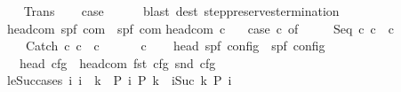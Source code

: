 \begin{isabellebody}
\isamarkupfalse%
\isanewline
\ \ \isamarkupfalse%
\ Trans\isanewline
\ \ \isamarkupfalse%
\ {\isacharquery}case\isanewline
\ \ \ \ \isamarkupfalse%
\ {\isacharparenleft}blast\ dest{\isacharcolon}\ step{\isacharunderscore}preserves{\isacharunderscore}termination{\isacharparenright}\isanewline
{}\isamarkupfalse%
%
\endisatagproof
{\isafoldproof}%
%
\isadelimproof
\isanewline
%
\endisadelimproof
\isanewline
\isanewline
\isanewline
{}\isamarkupfalse%
\ head{\isacharunderscore}com{\isacharcolon}{\isacharcolon}\ {\isachardoublequoteopen}{\isacharparenleft}{\isacharprime}s{\isacharcomma}{\isacharprime}p{\isacharcomma}{\isacharprime}f{\isacharparenright}\ com\ {\isasymRightarrow}\ {\isacharparenleft}{\isacharprime}s{\isacharcomma}{\isacharprime}p{\isacharcomma}{\isacharprime}f{\isacharparenright}\ com{\isachardoublequoteclose}\isanewline
{}\isanewline
{\isachardoublequoteopen}head{\isacharunderscore}com\ c\ {\isacharequal}\isanewline
\ \ {\isacharparenleft}case\ c\ of\isanewline
\ \ \ \ \ Seq\ c\ c\ {\isasymRightarrow}\ c\isanewline
\ \ \ {\isacharbar}\ Catch\ c\ c\ {\isasymRightarrow}\ c\isanewline
\ \ \ {\isacharbar}\ {\isacharunderscore}\ {\isasymRightarrow}\ c{\isacharparenright}{\isachardoublequoteclose}\isanewline
\isanewline
\ \ \isanewline
{}\isamarkupfalse%
\ head{\isacharcolon}{\isacharcolon}\ {\isachardoublequoteopen}{\isacharparenleft}{\isacharprime}s{\isacharcomma}{\isacharprime}p{\isacharcomma}{\isacharprime}f{\isacharparenright}\ config\ {\isasymRightarrow}\ {\isacharparenleft}{\isacharprime}s{\isacharcomma}{\isacharprime}p{\isacharcomma}{\isacharprime}f{\isacharparenright}\ config{\isachardoublequoteclose}\isanewline
\ \ \ {\isachardoublequoteopen}head\ cfg\ {\isacharequal}\ {\isacharparenleft}head{\isacharunderscore}com\ {\isacharparenleft}fst\ cfg{\isacharparenright}{\isacharcomma}\ snd\ cfg{\isacharparenright}{\isachardoublequoteclose}\isanewline
\isanewline
{}\isamarkupfalse%
\ le{\isacharunderscore}Suc{\isacharunderscore}cases{\isacharcolon}\ {\isachardoublequoteopen}{\isasymlbrakk}{\isasymAnd}i{\isachardot}\ {\isasymlbrakk}i\ {\isacharless}\ k{\isasymrbrakk}\ {\isasymLongrightarrow}\ P\ i{\isacharsemicolon}\ P\ k{\isasymrbrakk}\ {\isasymLongrightarrow}\ {\isasymforall}i{\isacharless}{\isacharparenleft}Suc\ k{\isacharparenright}{\isachardot}\ P\ i{\isachardoublequoteclose}\isanewline

\end{isabellebody}

